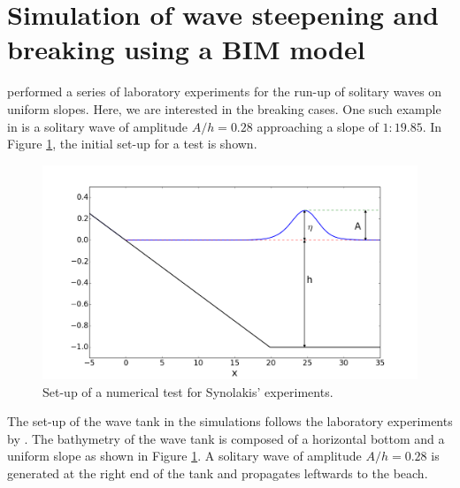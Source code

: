 \documentclass[review]{elsarticle}
\begin{document}

\section{Simulation of wave steepening and breaking using a BIM model}
\label{sec:wave_break}


\citet{synolakis1987runup} performed a series of laboratory experiments for the run-up of solitary waves
on uniform slopes. Here, we are interested in the  breaking cases. 
One such example in \citet{synolakis1987runup} is a solitary wave of amplitude $A/h=0.28$ 
approaching a slope of $1:19.85$. In Figure \ref{fig:init_setup}, the initial set-up for a test is shown. 

\begin{figure}[!htb]
\centering
\includegraphics[width=.7\textwidth]{_fig/initial_setup.png}
\caption{Set-up of a numerical test for Synolakis' experiments.}
\label{fig:init_setup}
\end{figure}

The set-up of the wave tank in the simulations follows the laboratory experiments by \citet{synolakis1987runup}. 
The bathymetry of the wave tank is composed of a horizontal bottom and 
a uniform slope as shown in Figure \ref{fig:init_setup}. 
A solitary wave of amplitude $A/h=0.28$ is generated at the right end of
the tank and propagates leftwards
to the beach. 
\end{document}
